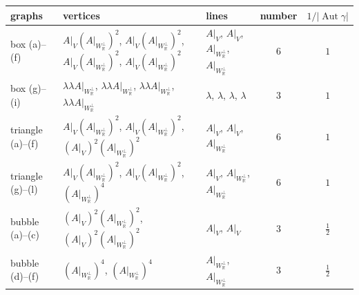 \begin{tabular}{l|l|l|c|c}
graphs & vertices & lines & number & $1/|\operatorname{Aut}\gamma|$ \\
\hline
box (a)--(f) & $A|_V(A|_{W_{\mathbb R}^\perp})^2$, $A|_V(A|_{W_{\mathbb R}^\perp})^2$, $A|_V(A|_{W_{\mathbb R}^\perp})^2$, $A|_V(A|_{W_{\mathbb R}^\perp})^2$ & $A|_V$, $A|_V$, $A|_{W_{\mathbb R}^\perp}$, $A|_{W_{\mathbb R}^\perp}$ & $6$ & $1$ \\
box (g)--(i) & $\lambda\lambda A|_{W_{\mathbb R}^\perp}$, $\lambda\lambda A|_{W_{\mathbb R}^\perp}$, $\lambda\lambda A|_{W_{\mathbb R}^\perp}$, $\lambda\lambda A|_{W_{\mathbb R}^\perp}$ & $\lambda$, $\lambda$, $\lambda$, $\lambda$ & $3$ & $1$ \\
triangle (a)--(f) & $A|_V(A|_{W_{\mathbb R}^\perp})^2$, $A|_V(A|_{W_{\mathbb R}^\perp})^2$, $(A|_V)^2(A|_{W_{\mathbb R}^\perp})^2$ & $A|_V$, $A|_V$, $A|_{W_{\mathbb R}^\perp}$ & $6$ & $1$ \\
triangle (g)--(l) & $A|_V(A|_{W_{\mathbb R}^\perp})^2$, $A|_V(A|_{W_{\mathbb R}^\perp})^2$, $(A|_{W_{\mathbb R}^\perp})^4$ & $A|_V$, $A|_{W_{\mathbb R}^\perp}$, $A|_{W_{\mathbb R}^\perp}$ & $6$ & $1$ \\
bubble (a)--(c) & $(A|_V)^2(A|_{W_{\mathbb R}^\perp})^2$, $(A|_V)^2(A|_{W_{\mathbb R}^\perp})^2$ & $A|_V$, $A|_V$ & $3$ & $\tfrac12$ \\
bubble (d)--(f) & $(A|_{W_{\mathbb R}^\perp})^4$, $(A|_{W_{\mathbb R}^\perp})^4$ & $A|_{W_{\mathbb R}^\perp}$, $A|_{W_{\mathbb R}^\perp}$ & $3$ & $\tfrac12$ \\
\end{tabular}

